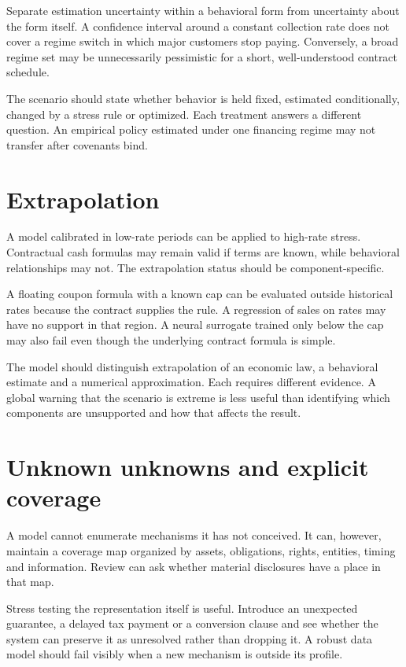 Separate estimation uncertainty within a behavioral form from uncertainty about the form itself. A confidence interval around a constant collection rate does not cover a regime switch in which major customers stop paying. Conversely, a broad regime set may be unnecessarily pessimistic for a short, well-understood contract schedule.

The scenario should state whether behavior is held fixed, estimated conditionally, changed by a stress rule or optimized. Each treatment answers a different question. An empirical policy estimated under one financing regime may not transfer after covenants bind.

\section{Extrapolation}
A model calibrated in low-rate periods can be applied to high-rate stress. Contractual cash formulas may remain valid if terms are known, while behavioral relationships may not. The extrapolation status should be component-specific.

A floating coupon formula with a known cap can be evaluated outside historical rates because the contract supplies the rule. A regression of sales on rates may have no support in that region. A neural surrogate trained only below the cap may also fail even though the underlying contract formula is simple.

The model should distinguish extrapolation of an economic law, a behavioral estimate and a numerical approximation. Each requires different evidence. A global warning that the scenario is extreme is less useful than identifying which components are unsupported and how that affects the result.

\section{Unknown unknowns and explicit coverage}
A model cannot enumerate mechanisms it has not conceived. It can, however, maintain a coverage map organized by assets, obligations, rights, entities, timing and information. Review can ask whether material disclosures have a place in that map.

Stress testing the representation itself is useful. Introduce an unexpected guarantee, a delayed tax payment or a conversion clause and see whether the system can preserve it as unresolved rather than dropping it. A robust data model should fail visibly when a new mechanism is outside its profile.

